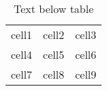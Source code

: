 \documentclass[12pt, a4paper]{article} %
\begin{document}
\begin{center}

\begin{table}[H] %
\centering

\begin{tabular}{ |l|c|r| } %
\hline                     %
cell1 & cell2 & cell3 \\   %
cell4 & cell5 & cell6 \\  
cell7 & cell8 & cell9 \\
\hline                     %
\end{tabular}

\caption{Text below table}
\label{table:sample_table_label}
\end{table}

\end{center}
\end{document}

